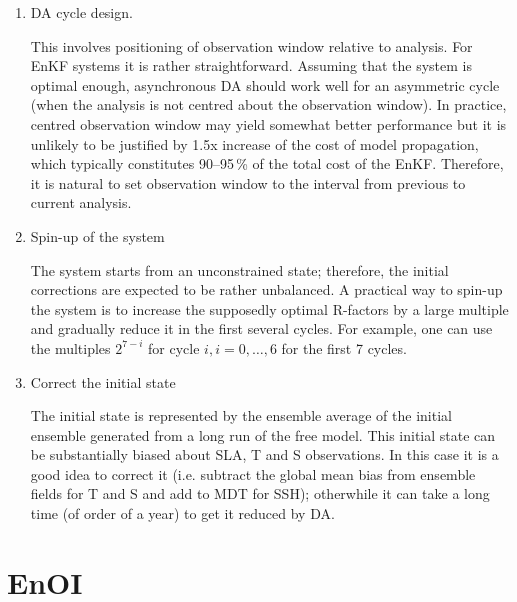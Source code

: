 \documentclass[11pt]{report}
\begin{document}
\begin{enumerate}
\item {DA cycle design.}

  This involves positioning of observation window relative to analysis.
  For EnKF systems it is rather straightforward.
  Assuming that the system is optimal enough, asynchronous DA should work well for an asymmetric cycle (when the analysis is not centred about the observation window).
  In practice, centred observation window may yield somewhat better performance but it is unlikely to be justified by 1.5x increase of the cost of model propagation, which typically constitutes 90--95\,\% of the total cost of the EnKF. 
  Therefore, it is natural to set observation window to the interval from previous to current analysis.

\item{Spin-up of the system}
 
  The system starts from an unconstrained state; therefore, the initial corrections are expected to be rather unbalanced.
  A practical way to spin-up the system is to increase the supposedly optimal R-factors by a large multiple and gradually reduce it in the first several cycles.
  For example, one can use the multiples $2^{7-i}$ for cycle $i, i = 0,\dots,6$ for the first 7 cycles.

\item{Correct the initial state}

  The initial state is represented by the ensemble average of the initial ensemble generated from a long run of the free model.
  This initial state can be substantially biased about SLA, T and S observations.
  In this case it is a good idea to correct it (i.e. subtract the global mean bias from ensemble fields for T and S and add to MDT for SSH); otherwhile it can take a long time (of order of a year) to get it reduced by DA.
  
\end{enumerate}

\section{EnOI}
\end{document}
